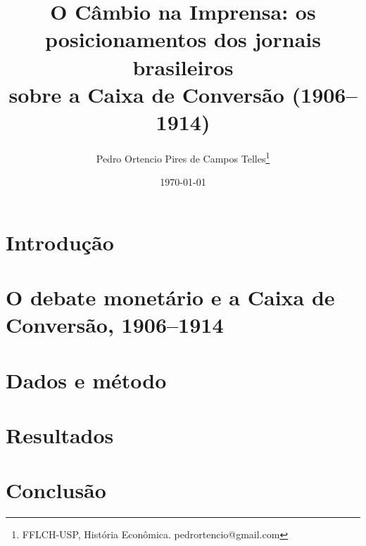 \documentclass[12pt,a4paper]{article}
\title{O Câmbio na Imprensa: os posicionamentos dos jornais brasileiros\\
sobre a Caixa de Conversão (1906--1914)}
\author{Pedro Ortencio Pires de Campos Telles\thanks{FFLCH-USP, História Econômica. pedrortencio@gmail.com}}
\date{\today}
\begin{document}
\maketitle

\begin{abstract}
\end{abstract}

\section{Introdução}\label{sec:intro}


\section{O debate monetário e a Caixa de Conversão, 1906--1914}\label{sec:contexto}


\section{Dados e método}\label{sec:metodo}


\section{Resultados}\label{sec:resultados}


\section{Conclusão}\label{sec:conclusao}




\end{document}
